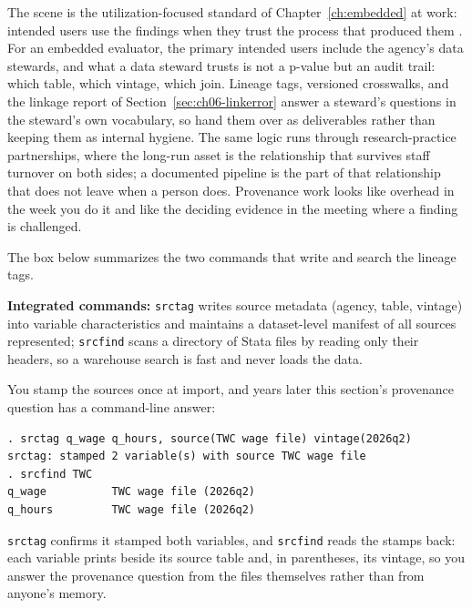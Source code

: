 The scene is the utilization-focused standard of Chapter~\ref{ch:embedded} at work: intended users use the findings when they trust the process that produced them \parencite{patton2008utilization}. For an embedded evaluator, the primary intended users include the agency's data stewards, and what a data steward trusts is not a p-value but an audit trail: which table, which vintage, which join. Lineage tags, versioned crosswalks, and the linkage report of Section~\ref{sec:ch06-linkerror} answer a steward's questions in the steward's own vocabulary, so hand them over as deliverables rather than keeping them as internal hygiene. The same logic runs through research-practice partnerships, where the long-run asset is the relationship that survives staff turnover on both sides; a documented pipeline is the part of that relationship that does not leave when a person does. Provenance work looks like overhead in the week you do it and like the deciding evidence in the meeting where a finding is challenged.

The box below summarizes the two commands that write and search the lineage tags.

\begin{kaobox}[frametitle=Package Integration: \texttt{srctag} and \texttt{srcfind}]
\textbf{Integrated commands:} \texttt{srctag} writes source metadata (agency, table, vintage) into variable characteristics and maintains a dataset-level manifest of all sources represented; \texttt{srcfind} scans a directory of Stata files by reading only their headers, so a warehouse search is fast and never loads the data.
\end{kaobox}

You stamp the sources once at import, and years later this section's provenance question has a command-line answer:
\par
{\footnotesize
\begin{verbatim}
. srctag q_wage q_hours, source(TWC wage file) vintage(2026q2)
srctag: stamped 2 variable(s) with source TWC wage file
. srcfind TWC
q_wage          TWC wage file (2026q2)
q_hours         TWC wage file (2026q2)
\end{verbatim}
}
\texttt{srctag} confirms it stamped both variables, and \texttt{srcfind} reads the stamps back: each variable prints beside its source table and, in parentheses, its vintage, so you answer the provenance question from the files themselves rather than from anyone's memory.

